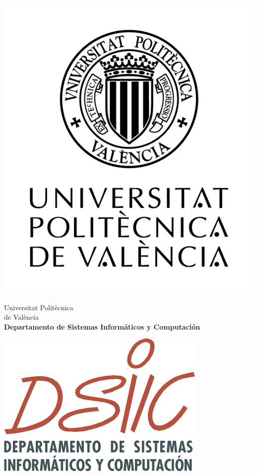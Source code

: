 \begin{titlepage}

\begin{minipage}{0.12\linewidth}
\vspace*{0.7cm}
\hspace*{-2cm}
\noindent
\includegraphics[scale=0.75]{include/logo-upv.png} \qquad\qquad
\end{minipage}
\begin{minipage}{0.74\linewidth}
\begin{center}
\huge{ Universitat Politècnica\\de València }\\
\vspace*{0.5cm}
\Large{\textbf{Departamento de Sistemas Informáticos y Computación}}
\end{center}
\end{minipage}
\begin{minipage}{0.12\linewidth}
\includegraphics[scale=0.9]{include/DSIC.png} 
\end{minipage}


\end{titlepage}
